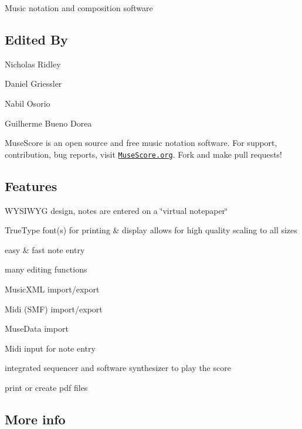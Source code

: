  Music notation and composition software

\subsection*{Edited By}


\begin{DoxyItemize}
\item Nicholas Ridley
\item Daniel Griessler
\item Nabil Osorio
\item Guilherme Bueno Dorea
\end{DoxyItemize}

\href{https://travis-ci.org/musescore/MuseScore}{\tt } \href{https://ci.appveyor.com/project/MuseScore/musescore/branch/master}{\tt }

\href{https://www.gnu.org/licenses/old-licenses/gpl-2.0.html}{\tt }

Muse\+Score is an open source and free music notation software. For support, contribution, bug reports, visit \href{https://musescore.org}{\tt Muse\+Score.\+org}. Fork and make pull requests!

\subsection*{Features}


\begin{DoxyItemize}
\item W\+Y\+S\+I\+W\+YG design, notes are entered on a \char`\"{}virtual notepaper\char`\"{}
\item True\+Type font(s) for printing \& display allows for high quality scaling to all sizes
\item easy \& fast note entry
\item many editing functions
\item Music\+X\+ML import/export
\item Midi (S\+MF) import/export
\item Muse\+Data import
\item Midi input for note entry
\item integrated sequencer and software synthesizer to play the score
\item print or create pdf files
\end{DoxyItemize}

\subsection*{More info}


